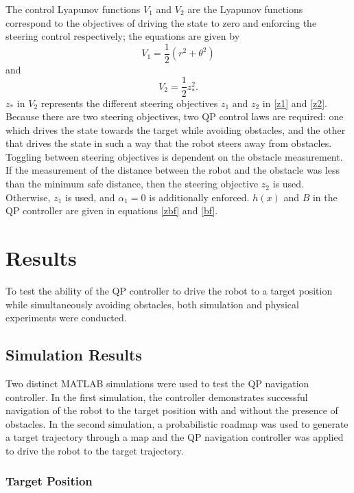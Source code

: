 \documentclass[journal]{IEEEtran}
\begin{document}
The control Lyapunov functions $V_1$ and $V_2$ are the Lyapunov functions correspond to the objectives of driving the state to zero and enforcing the steering control respectively; the equations are given by 
\begin{equation}
V_1=\frac{1}{2}(r^2+\theta^2)
\end{equation} and
\begin{equation}
V_2=\frac{1}{2}z_*^2.
\end{equation}
$z_*$ in $V_2$ represents the different steering objectives $z_1$ and $z_2$ in \eqref{z1} and \eqref{z2}. Because there are two steering objectives, two QP control laws are required: one which drives the state towards the target while avoiding obstacles, and the other that drives the state in such a way that the robot steers away from obstacles. Toggling between steering objectives is dependent on the obstacle measurement. If the measurement of the distance between the robot and the obstacle was less than the minimum safe distance, then the steering objective $z_2$ is used. Otherwise, $z_1$ is used, and $\alpha_1=0$ is additionally enforced. $h(x)$ and $B$ in the QP controller are given in equations \eqref{zbf} and \eqref{bf}. 

\section{Results}
To test the ability of the QP controller to drive the robot to a target position while simultaneously avoiding obstacles, both simulation and physical experiments were conducted.

\subsection{Simulation Results}
Two distinct MATLAB simulations were used to test the QP navigation controller. In the first simulation, the controller demonstrates successful navigation of the robot to the target position with and without the presence of obstacles. In the second simulation, a probabilistic roadmap was used to generate a target trajectory through a map and the QP navigation controller was applied to drive the robot to the target trajectory. 

\subsubsection{Target Position}
\end{document}
